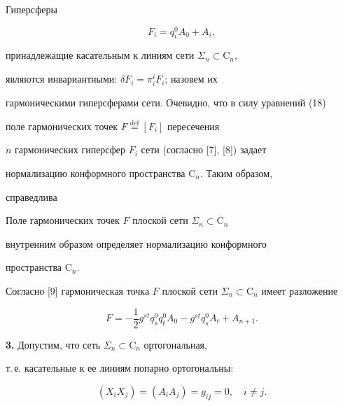  


Гиперсферы 


\begin{equation} 


F_i=q^0_i A_0+A_i,


\end{equation} 


принадлежащие касательным к линиям сети $\Sigma_n\subset\mathrm C_n$, 


являются инвариантными: $\delta F_i=\pi^i_i F_i$; назовем их 


гармоническими гиперсферами сети. Очевидно, что в силу уравнений (18) 


поле гармонических точек $F\overset{\mathrm {def}}{=}{}[F_i]$ пересечения 


$n$ гармонических гиперсфер $F_i$ сети (согласно [7], [8]) задает 


нормализацию конформного пространства $\mathrm C_n$. Таким образом, 


справедлива 


 


\begin{thm} 


Поле гармонических точек $F$ плоской сети $\Sigma_n\subset\mathrm C_n$ 


внутренним образом определяет нормализацию конформного 


пространства $\mathrm C_n$. 


\end{thm} 


 


Согласно [9] гармоническая точка $F$ плоской сети $\Sigma_n\subset\mathrm 


C_n$ имеет разложение 


$$ 


F=-\frac{1}{2}g^{st}q^0_s q^0_t A_0-g^{st}q^0_s A_t+A_{n+1}. 


$$ 


 


{\bf 3.} Допустим, что сеть $\Sigma_n\subset\mathrm C_n$ ортогональная, 


т.\,е. касательные к ее линиям попарно ортогональны: 


\begin{equation} 


(X_i X_j)=(A_i A_j)=g_{ij}=0,\quad i\ne j. 


\end{equation} 


